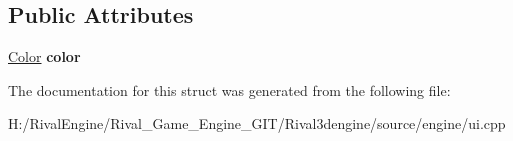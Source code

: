 \subsection*{Public Attributes}
\begin{DoxyCompactItemize}
\item 
\mbox{\label{struct_u_i_1_1_line_a89876611d5df52a8a3069ccfe80abc75}} 
\hyperlink{struct_u_i_1_1_color}{Color} {\bfseries color}
\end{DoxyCompactItemize}


The documentation for this struct was generated from the following file\+:\begin{DoxyCompactItemize}
\item 
H\+:/\+Rival\+Engine/\+Rival\+\_\+\+Game\+\_\+\+Engine\+\_\+\+G\+I\+T/\+Rival3dengine/source/engine/ui.\+cpp\end{DoxyCompactItemize}
